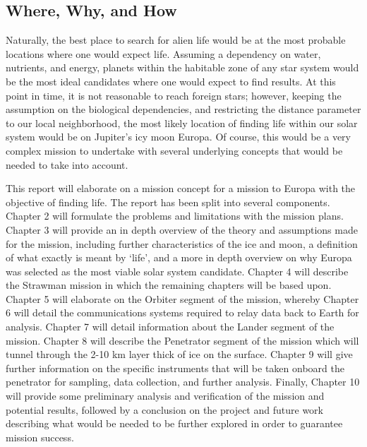 \subsection{Where, Why, and How}
Naturally, the best place to search for alien life would be at the most probable locations where one would expect life. Assuming a dependency on water, nutrients, and energy, planets within the habitable zone of any star system would be the most ideal candidates where one would expect to find results. At this point in time, it is not reasonable to reach foreign stars; however, keeping the assumption on the biological dependencies, and restricting the distance parameter to our local neighborhood, the most likely location of finding life within our solar system would be on Jupiter's icy moon Europa. Of course, this would be a very complex mission to undertake with several underlying concepts that would be needed to take into account.

This report will elaborate on a mission concept for a mission to Europa with the objective of finding life. The report has been split into several components. Chapter 2 will formulate the problems and limitations with the mission plans. Chapter 3 will provide an in depth overview of the theory and assumptions made for the mission, including further characteristics of the ice and moon, a definition of what exactly is meant by `life', and a more in depth overview on why Europa was selected as the most viable solar system candidate. Chapter 4 will describe the Strawman mission in which the remaining chapters will be based upon.  Chapter 5 will elaborate on the Orbiter segment of the mission, whereby Chapter 6 will detail the communications systems required to relay data back to Earth for analysis. Chapter 7 will detail information about the Lander segment of the mission. Chapter 8 will describe the Penetrator segment of the mission which will tunnel through the 2-10 km layer thick of ice on the surface. Chapter 9 will give further information on the specific instruments that will be taken onboard the penetrator for sampling, data collection, and further analysis. Finally, Chapter 10 will provide some preliminary analysis and verification of the mission and potential results, followed by a conclusion on the project and future work describing what would be needed to be further explored in order to guarantee mission success.